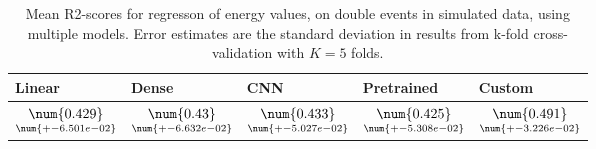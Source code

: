 \begin{table}
\centering
\caption{
Mean R2-scores for regresson of energy values, on double events in simulated data, using multiple models. 
Error estimates are the standard deviation in results from k-fold cross-validation 
with $K=5$ folds.
}
\label{tab:regression-simulated-double-energy-r2}
\begin{tabular}{lllll}
\toprule
                                             Linear &                                              Dense &                                                 CNN &                                          Pretrained &                                              Custom \\
\midrule
 $\underset{\num{+- 6.501e-02 }  }{\num{ 0.429 } }$ &  $\underset{\num{+- 6.632e-02 }  }{\num{ 0.43 } }$ &  $\underset{\num{+- 5.027e-02 }  }{\num{ 0.433 } }$ &  $\underset{\num{+- 5.308e-02 }  }{\num{ 0.425 } }$ &  $\underset{\num{+- 3.226e-02 }  }{\num{ 0.491 } }$ \\
\bottomrule
\end{tabular}
\end{table}

